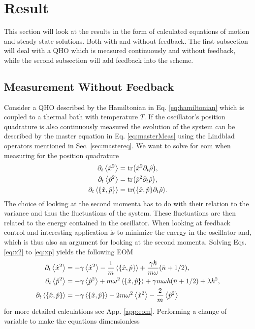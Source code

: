 \section{Result}
This section will look at the results in the form of calculated equations of motion and steady state solutions. Both with and without feedback. The first subsection will deal with a QHO which is measured continuously and without feedback, while the second subsection will add feedback into the scheme.
\subsection{Measurement Without Feedback}
Consider a QHO described by the Hamiltonian in Eq. \eqref{eq:hamiltonian} which is coupled to a thermal bath with temperature $T$. If the oscillator's position quadrature is also continuously measured the evolution of the system can be described by the master equation in Eq. \eqref{eq:masterMeas} using the Lindblad operators mentioned in Sec. \ref{sec:mastereq}. We want to solve for \gls{eom} when measuring for the position quadrature
\begin{align}
    \dt\expval{\xop^2} &= \tr(\xop^2 \dt \dmatrix)\label{eq:x2}, \\
    \dt\expval{\pop^2} &= \tr(\pop^2 \dt \dmatrix)\label{eq:p2},\\
    \dt\expval{\acomm{\xop}{\pop}} &= \tr(\acomm{\xop}{\pop} \dt \dmatrix). \label{eq:xp}
\end{align}
The choice of looking at the second momenta has to do with their relation to the variance and thus the fluctuations of the system. These fluctuations are then related to the energy contained in the oscillator. When looking at feedback control and interesting application is to minimize the energy in the oscillator and, which is thus also an argument for looking at the second momenta.
Solving Eqs. \eqref{eq:x2} to \eqref{eq:xp} yields the following EOM
\begin{align}
    \dt\expval{\xop^2} &= - \gamma \expval{\xop^2} - \frac{1}{m}\expval{\acomm{\xop}{\pop}} + \frac{\gamma \hbar}{m\omega}(\nbar + 1/2),\\
    \dt\expval{\pop^2} &= -\gamma \expval{\pop^2} + m\omega^2 \expval{\acomm{\xop}{\pop}} + \gamma m \omega\hbar (\nbar + 1/2) + \lambda \hbar^2,\\
    \dt\expval{\acomm{\xop}{\pop}} &= -\gamma \expval{\acomm{\xop}{\pop}} + 2 m \omega^2 \expval{\xop^2} - \frac{2}{m} \expval{\pop^2}
\end{align}
for more detailed calculations see App. \ref{app:eom}. Performing a change of variable to make the equations dimensionless
